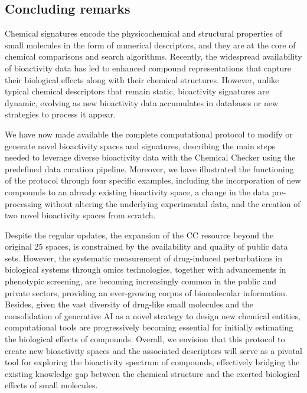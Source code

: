 \subsection{Concluding remarks}

Chemical signatures encode the physicochemical and structural properties of small molecules in the form of numerical descriptors, and they are at the core of chemical comparisons and search algorithms\cite{fernandez-torras_connecting_2022}. Recently, the widespread availability of bioactivity data has led to enhanced compound representations that capture their biological effects along with their chemical structures. However, unlike typical chemical descriptors that remain static, bioactivity signatures are dynamic, evolving as new bioactivity data accumulates in databases or new strategies to process it appear.

We have now made available the complete computational protocol to modify or generate novel bioactivity spaces and signatures, describing the main steps needed to leverage diverse bioactivity data with the Chemical Checker using the predefined data curation pipeline. Moreover, we have illustrated the functioning of the protocol through four specific examples, including the incorporation of new compounds to an already existing bioactivity space, a change in the data pre-processing without altering the underlying experimental data, and the creation of two novel bioactivity spaces from scratch. 

Despite the regular updates, the expansion of the CC resource beyond the original 25 spaces, is constrained by the availability and quality of public data sets. However, the systematic measurement of drug-induced perturbations in biological systems through omics technologies, together with advancements in phenotypic screening, are becoming increasingly common in the public and private sectors, providing an ever-growing corpus of biomolecular information. Besides, given the vast diversity of drug-like small molecules and the consolidation of generative AI as a novel strategy to design new chemical entities, computational tools are progressively becoming essential for initially estimating the biological effects of compounds. Overall, we envision that this protocol to create new bioactivity spaces and the associated descriptors will serve as a pivotal tool for exploring the bioactivity spectrum of compounds, effectively bridging the existing knowledge gap between the chemical structure and the exerted biological effects of small molecules.